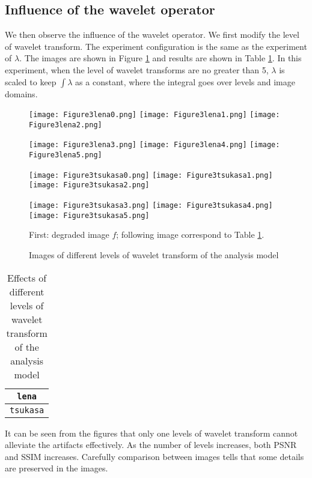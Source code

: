 \documentclass[english, nochinese]{pnote}
\begin{document}
\subsection{Influence of the wavelet operator}

We then observe the influence of the wavelet operator. We first modify the level of wavelet transform. The experiment configuration is the same as the experiment of $\lambda$. The images are shown in Figure \ref{Fig:AnaLevel} and results are shown in Table \ref{Tbl:AnaLevel}. In this experiment, when the level of wavelet transforms are no greater than 5, $\lambda$ is scaled to keep $ \int \lambda $ as a constant, where the integral goes over levels and image domains.

\begin{figure}[htbp]
{
\centering

\texttt{[image: Figure3lena0.png]}
\texttt{[image: Figure3lena1.png]}
\texttt{[image: Figure3lena2.png]}

\texttt{[image: Figure3lena3.png]}
\texttt{[image: Figure3lena4.png]}
\texttt{[image: Figure3lena5.png]}

\texttt{[image: Figure3tsukasa0.png]}
\texttt{[image: Figure3tsukasa1.png]}
\texttt{[image: Figure3tsukasa2.png]}

\texttt{[image: Figure3tsukasa3.png]}
\texttt{[image: Figure3tsukasa4.png]}
\texttt{[image: Figure3tsukasa5.png]}

\caption{Images of different levels of wavelet transform of the analysis model}
\label{Fig:AnaLevel}
}
{
\footnotesize First: degraded image $f$; following image correspond to Table \ref{Tbl:AnaLevel}.
}
\end{figure}

\begin{table}[htbp]
\centering
\begin{tabular}{|c|c|c|c|c|c|c|}
\hline
\multicolumn{7}{|c|}{\texttt{lena}} \\
\hline

\multicolumn{7}{|c|}{\texttt{tsukasa}} \\
\hline

\end{tabular}
\caption{Effects of different levels of wavelet transform of the analysis model}
\label{Tbl:AnaLevel}
\end{table}

It can be seen from the figures that only one levels of wavelet transform cannot alleviate the artifacts effectively. As the number of levels increases, both PSNR and SSIM increases. Carefully comparison between images tells that some details are preserved in the images.
\end{document}

